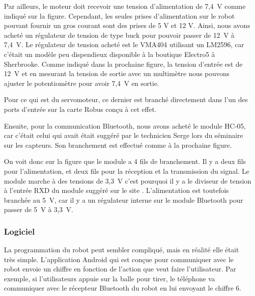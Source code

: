 
Par ailleurs, le moteur doit recevoir une tension d’alimentation de 7,4~V comme indiqué sur la figure.
Cependant, les seules prises d’alimentation sur le robot pouvant fournir un gros courant sont des prises de 5 V et 12 V.
Ainsi, nous avons acheté un régulateur de tension de type buck pour pouvoir passer de 12~V à 7,4~V.
Le régulateur de tension acheté est le VMA404 utilisant un LM2596, car c’était un modèle peu dispendieux disponible à la boutique Electro5 à Sherbrooke.
Comme indiqué dans la prochaine figure, la tension d’entrée est de 12~V et en mesurant la tension de sortie avec un multimètre nous pouvons ajuster le potentiomètre pour avoir 7,4~V en sortie.


Pour ce qui est du servomoteur, ce dernier est branché directement dans l’un des ports d’entrée sur la carte Robus conçu à cet effet.

Ensuite, pour la communication Bluetooth, nous avons acheté le module HC-05, car c’était celui qui avait était suggéré par le technicien Serge lors du séminaire sur les capteurs.
Son branchement est effectué comme à la prochaine figure.


On voit donc sur la figure  que le module a 4 fils de branchement.
Il y a deux fils pour l’alimentation, et deux fils pour la réception et la transmission du signal.
Le module marche à des tensions de 3,3~V c’est pourquoi il y a le diviseur de tension à l’entrée RXD du module suggéré sur le site \cite{noauthor_setting_nodate}.
L’alimentation est toutefois branchée au 5~V, car il y a un régulateur interne sur le module Bluetooth pour passer de 5~V à 3,3~V.

\subsubsection{Logiciel}



La programmation du robot peut sembler compliqué, mais en réalité elle était très simple.
L’application Android qui est conçue pour communiquer avec le robot envoie un chiffre en fonction de l’action que veut faire l’utilisateur.
Par exemple, si l’utilisateurs appuie sur la balle pour tirer, le téléphone va communiquer avec le récepteur Bluetooth du robot en lui envoyant le chiffre 6.

